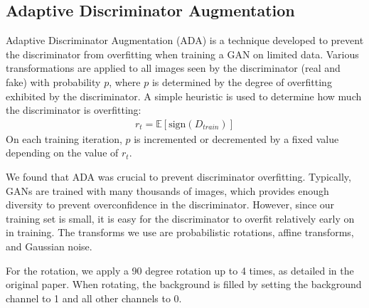 \subsection{Adaptive Discriminator Augmentation}

Adaptive Discriminator Augmentation (ADA) \cite{karras2020training} is a technique developed to prevent the discriminator from overfitting when training a GAN on limited data.
Various transformations are applied to all images seen by the discriminator (real and fake) with probability $p$, where $p$ is determined by the degree of overfitting exhibited by the discriminator.
A simple heuristic is used to determine how much the discriminator is overfitting:
\begin{align}
    r_t = \mathbb{E}[\text{sign}(D_{train})]
\end{align}
On each training iteration, $p$ is incremented or decremented by a fixed value depending on the value of $r_t$.

We found that ADA was crucial to prevent discriminator overfitting. 
Typically, GANs are trained with many thousands of images, which provides enough diversity to prevent overconfidence in the discriminator.
However, since our training set is small, it is easy for the discriminator to overfit relatively early on in training.
The transforms we use are probabilistic rotations, affine transforms, and Gaussian noise.

For the rotation, we apply a 90 degree rotation up to 4 times, as detailed in the original paper.
When rotating, the background is filled by setting the background channel to 1 and all other channels to 0.


